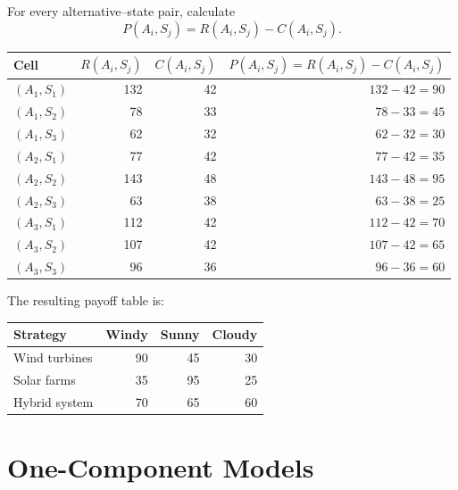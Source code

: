 For every alternative--state pair, calculate
\[
P(A_i,S_j)=R(A_i,S_j)-C(A_i,S_j).
\]

\begin{center}
	\small
	\begin{tabular}{lrrr}
		\toprule
		Cell
		& \(R(A_i,S_j)\)
		& \(C(A_i,S_j)\)
		& \(P(A_i,S_j)=R(A_i,S_j)-C(A_i,S_j)\) \\
		\midrule
		\((A_1,S_1)\) & 132 & 42 & \(132-42=90\) \\
		\((A_1,S_2)\) & 78  & 33 & \(78-33=45\) \\
		\((A_1,S_3)\) & 62  & 32 & \(62-32=30\) \\
		\((A_2,S_1)\) & 77  & 42 & \(77-42=35\) \\
		\((A_2,S_2)\) & 143 & 48 & \(143-48=95\) \\
		\((A_2,S_3)\) & 63  & 38 & \(63-38=25\) \\
		\((A_3,S_1)\) & 112 & 42 & \(112-42=70\) \\
		\((A_3,S_2)\) & 107 & 42 & \(107-42=65\) \\
		\((A_3,S_3)\) & 96  & 36 & \(96-36=60\) \\
		\bottomrule
	\end{tabular}
\end{center}

The resulting payoff table is:

\begin{center}
	\begin{tabular}{lrrr}
		\toprule
		Strategy & Windy & Sunny & Cloudy \\
		\midrule
		Wind turbines & 90 & 45 & 30 \\
		Solar farms & 35 & 95 & 25 \\
		Hybrid system & 70 & 65 & 60 \\
		\bottomrule
	\end{tabular}
\end{center}


\section{One-Component Models}
\label{sec:one-component-models}


